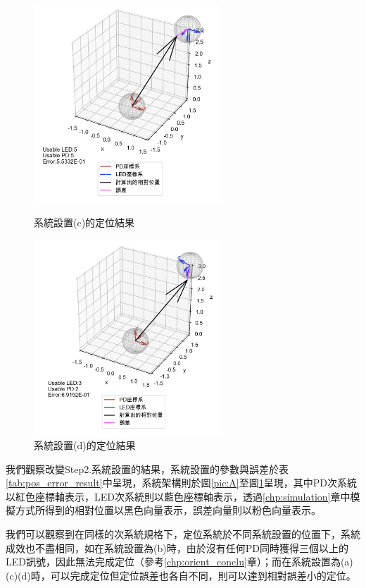 \begin{figure}[htpb]
    \centering
    \begin{minipage}{.5\textwidth}
        \centering
        \includegraphics[width=7cm]{ch4pic/C.png}
        \caption{系統設置(c)的定位結果}
        \label{pic:C}
    \end{minipage}%
    \begin{minipage}{0.5\textwidth}
        \centering
        \includegraphics[width=7cm]{ch4pic/D.png}
        \caption{系統設置(d)的定位結果}
        \label{pic:D}
    \end{minipage}

\end{figure}


我們觀察改變Step2.系統設置的結果，系統設置的參數與誤差於表\ref{tab:pos_error_result}中呈現，系統架構則於圖\ref{pic:A}至圖\ref{pic:D}呈現，其中PD次系統以紅色座標軸表示，LED次系統則以藍色座標軸表示，透過\ref{chp:simulation}章中模擬方式所得到的相對位置以黑色向量表示，誤差向量則以粉色向量表示。

我們可以觀察到在同樣的次系統規格下，定位系統於不同系統設置的位置下，系統成效也不盡相同，如在系統設置為(b)時，由於沒有任何PD同時獲得三個以上的LED訊號，因此無法完成定位（參考\ref{chp:orient_conclu}章）；而在系統設置為(a)(c)(d)時，可以完成定位但定位誤差也各自不同，則可以達到相對誤差小的定位。

